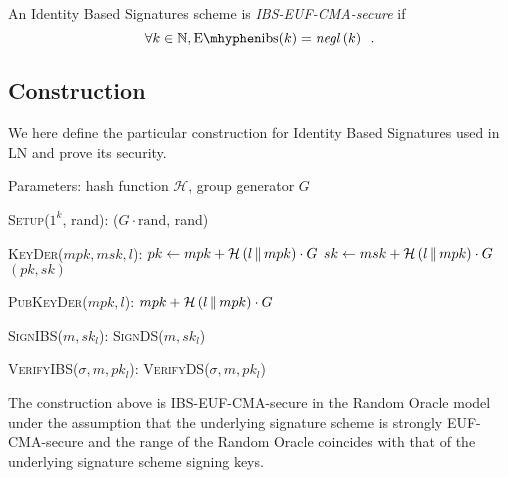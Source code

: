   \begin{definition}
    \label{def:ibs:secure:sup}
    An Identity Based Signatures scheme is \emph{\textsf{IBS-EUF-CMA}-secure}
    if
    \begin{equation*}
      \forall k \in \mathbb{N}, \mathrm{E \mhyphen ibs}(k) =
      \mathit{negl}\left(k\right) \enspace.
    \end{equation*}
  \end{definition}

  \subsection{Construction}
    We here define the particular construction for Identity Based Signatures
    used in LN and prove its security.

    Parameters: hash function $\mathcal{H}$, group generator $G$
    \begin{algorithmic}[0]
      \State \textsc{Setup}($1^k$, rand):
      \Indent
        \State \Return ($G \cdot \mathrm{rand}$, rand)
      \EndIndent
    \end{algorithmic}

    \begin{algorithmic}[0]
      \State \textsc{KeyDer}($mpk, msk, l$):
      \Indent
        \State $pk \gets mpk + \mathcal{H}\left(l \,\|\, mpk\right) \cdot G$
        \State $sk \gets msk + \mathcal{H}\left(l \,\|\, mpk\right) \cdot G$
        \State \Return $(pk, sk)$
      \EndIndent
    \end{algorithmic}

    \begin{algorithmic}[0]
      \State \textsc{PubKeyDer}($mpk, l$):
      \Indent
        \State \Return $mpk + \mathcal{H}\left(l \,\|\, mpk\right) \cdot G$
      \EndIndent
    \end{algorithmic}

    \begin{algorithmic}[0]
      \State \textsc{SignIBS}($m, sk_l$):
      \Indent
        \State \Return \textsc{SignDS}($m, sk_l$)
      \EndIndent
    \end{algorithmic}

    \begin{algorithmic}[0]
      \State \textsc{VerifyIBS}($\sigma, m, pk_l$):
      \Indent
        \State \Return \textsc{VerifyDS}($\sigma, m, pk_l$)
      \EndIndent
    \end{algorithmic}

    \begin{lemma}
      \label{lemma:ibs}
      The construction above is \textsf{IBS-EUF-CMA}-secure in the Random Oracle
      model under the assumption that the underlying signature scheme is
      strongly \textsf{EUF-CMA}-secure and the range of the Random Oracle
      coincides with that of the underlying signature scheme signing keys.
    \end{lemma}
